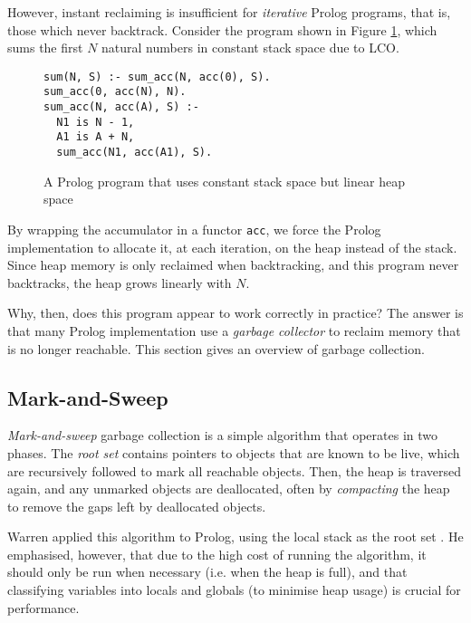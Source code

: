 However, instant reclaiming is insufficient for \emph{iterative} Prolog programs, that is, those which never backtrack. Consider the program shown in Figure \ref{fig:iterative}, which sums the first $N$ natural numbers in constant stack space due to LCO.

\begin{figure}[H]
\begin{center}
\begin{verbatim}
sum(N, S) :- sum_acc(N, acc(0), S).
sum_acc(0, acc(N), N).
sum_acc(N, acc(A), S) :-
  N1 is N - 1,
  A1 is A + N,
  sum_acc(N1, acc(A1), S).
\end{verbatim}
\end{center}
\caption{A Prolog program that uses constant stack space but linear heap space}
\label{fig:iterative}
\end{figure}

By wrapping the accumulator in a functor \texttt{acc}, we force the Prolog implementation to allocate it, at each iteration, on the heap instead of the stack. Since heap memory is only reclaimed when backtracking, and this program never backtracks, the heap grows linearly with $N$.

Why, then, does this program appear to work correctly in practice? The answer is that many Prolog implementation use a \emph{garbage collector} to reclaim memory that is no longer reachable. This section gives an overview of garbage collection.

\subsection{Mark-and-Sweep}

\emph{Mark-and-sweep} garbage collection is a simple algorithm that operates in two phases. The \emph{root set} contains pointers to objects that are known to be live, which are recursively followed to mark all reachable objects. Then, the heap is traversed again, and any unmarked objects are deallocated, often by \emph{compacting} the heap to remove the gaps left by deallocated objects.

Warren applied this algorithm to Prolog, using the local stack as the root set \cite{warrenImplementingPrologCompiling1977}. He emphasised, however, that due to the high cost of running the algorithm, it should only be run when necessary (i.e. when the heap is full), and that classifying variables into locals and globals (to minimise heap usage) is crucial for performance.

